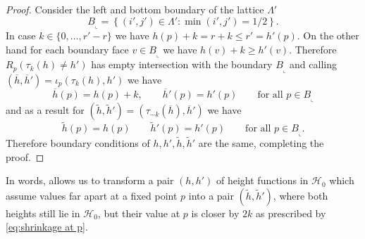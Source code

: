 \documentclass[reqno,11pt]{amsart}
\numberwithin{equation}{section}
\theoremstyle{definition}
\begin{document}
\begin{proof}
    Consider the left and bottom boundary of the lattice $\Lambda'$
    \begin{equation*}
        B_{\llcorner} = \left\{ (i',j') \in \Lambda' : \min(i',j')=1/2 \right\}.
    \end{equation*}
    In case $k \in \{ 0, \dots, r'-r \}$ we have $h(p)+k = r+k \le r' = h'(p).$
    On the other hand for each boundary face $v \in B_{\llcorner}$ we have $h(v) + k \ge h'(v)$.  Therefore $R_p(\tau_k(h) \neq h')$ has empty intersection with the boundary $B_{\llcorner}$ and calling $(\overline{h}, \overline{h}') = \iota_p (\tau_k(h),h')$ we have
    \begin{equation*}
        \overline{h}(p) = h(p)+k, \qquad \overline{h}'(p) = h'(p) \qquad \text{for all } p \in B_{\llcorner}
    \end{equation*}
    and as a result for $(\widetilde{h},\widetilde{h}')=(\tau_{-k}(\overline{h}), \overline{h}')$ we have
    \begin{equation*}
        \widetilde{h}(p) = h(p) \qquad \widetilde{h}'(p) = h'(p) \qquad \text{for all } p \in B_{\llcorner}.
    \end{equation*}
    Therefore boundary conditions of $h,h',\widetilde{h},\widetilde{h}'$ are the same, completing the proof.
\end{proof}

In words,  allows us to transform a pair $(h,h')$ of height functions in $\mathscr{H}_0^{}$ which assume values far apart at a fixed point $p$ into a pair $(\widetilde{h},\widetilde{h}')$, where both heights still lie in $\mathscr{H}_0^{}$, but their value at $p$ is closer by $2k$ as prescribed by \eqref{eq:shrinkage at p}.
\end{document}
